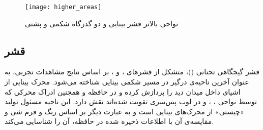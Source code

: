 \begin{figure}
\centering
{\footnotesize
\texttt{[image: higher\_areas]}
\caption[نواحی بالاتر قشر بینایی و دو گذرگاه شکمی و پشتی]{نواحی بالاتر قشر بینایی و دو گذرگاه شکمی و پشتی\cite{kandel2000principles}}
\label{fig:higher_areas}
}
\end{figure}

\subsection{قشر }
قشر گیجگاهی تحتانی ()، متشکل از قشرهای ،  و ، بر اساس نتایج مشاهدات تجربی، به عنوان آخرین ناحیه‌ی درگیر در مسیر شکمی بینایی شناخته می‌شود.  محرک بینایی از اشیای داخل میدان دید را پردازش کرده و در حافظه و همچنین ادراک محرکی که توسط نواحی ، ،  و  در لوب پس‌سری تقویت شده‌اند نقش دارد. این ناحیه مسئول تولید «چیستی» از محرک‌های بینایی است و به عبارت دیگر بر اساس رنگ و فرم شی و مقایسه‌ی آن با اطلاعات ذخیره شده در حافظه، آن را شناسایی می‌کند.